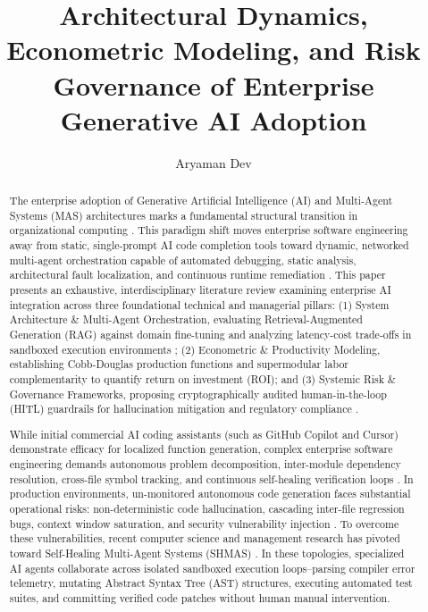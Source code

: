 \documentclass[10pt,journal,compsoc,twocolumn]{IEEEtran}
\begin{document}
\title{Architectural Dynamics, Econometric Modeling, and Risk Governance of Enterprise Generative AI Adoption}

\author{
Aryaman Dev\\

}

\maketitle

\begin{abstract}
The enterprise adoption of Generative Artificial Intelligence (AI) and Multi-Agent Systems (MAS) architectures marks a fundamental structural transition in organizational computing \cite{openalex_w4366817968}. This paradigm shift moves enterprise software engineering away from static, single-prompt AI code completion tools toward dynamic, networked multi-agent orchestration capable of automated debugging, static analysis, architectural fault localization, and continuous runtime remediation \cite{feuerriegel2023generativeai}. This paper presents an exhaustive, interdisciplinary literature review examining enterprise AI integration across three foundational technical and managerial pillars: (1) System Architecture \& Multi-Agent Orchestration, evaluating Retrieval-Augmented Generation (RAG) against domain fine-tuning and analyzing latency-cost trade-offs in sandboxed execution environments \cite{crossref_10_56975_ijcrt_v14i1_297627}; (2) Econometric \& Productivity Modeling, establishing Cobb-Douglas production functions and supermodular labor complementarity to quantify return on investment (ROI); and (3) Systemic Risk \& Governance Frameworks, proposing cryptographically audited human-in-the-loop (HITL) guardrails for hallucination mitigation and regulatory compliance \cite{openalex_w7125699492}.


While initial commercial AI coding assistants (such as GitHub Copilot and Cursor) demonstrate efficacy for localized function generation, complex enterprise software engineering demands autonomous problem decomposition, inter-module dependency resolution, cross-file symbol tracking, and continuous self-healing verification loops \cite{joshua2026adoptiondepth}. In production environments, un-monitored autonomous code generation faces substantial operational risks: non-deterministic code hallucination, cascading inter-file regression bugs, context window saturation, and security vulnerability injection \cite{wooldridge2009}. To overcome these vulnerabilities, recent computer science and management research has pivoted toward Self-Healing Multi-Agent Systems (SHMAS) \cite{openalex_w4414281281}. In these topologies, specialized AI agents collaborate across isolated sandboxed execution loops--parsing compiler error telemetry, mutating Abstract Syntax Tree (AST) structures, executing automated test suites, and committing verified code patches without human manual intervention.


\end{abstract}
\end{document}

